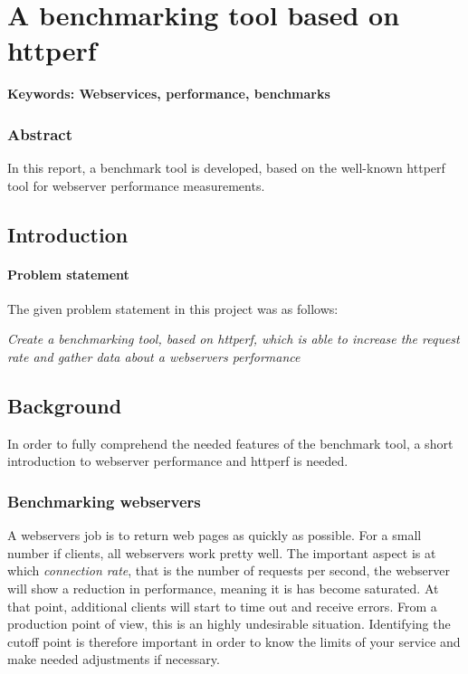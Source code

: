 \chapter{A benchmarking tool based on httperf}

\textbf{Keywords: Webservices, performance, benchmarks }

\subsection*{Abstract}

In this report, a benchmark tool is developed, based on the well-known httperf tool for webserver performance measurements. 

\section{Introduction}

\subsubsection{Problem statement}

The given problem statement in this project was as follows:

\emph{Create a benchmarking tool, based on httperf, which is able to increase the request rate and gather data about a webservers performance }

\section{Background}

In order to fully comprehend the needed features of the benchmark tool, a short introduction to webserver performance and httperf is needed. 

\subsection{Benchmarking webservers}

A webservers job is to return web pages as quickly as possible. For a small number if clients, all webservers work pretty well. The important aspect is at which \emph{connection rate}, that is the number of requests per second, the webserver will show a reduction in performance, meaning it is has become saturated. At that point, additional clients will start to time out and receive errors. From a production point of view, this is an highly undesirable situation. Identifying the cutoff point is therefore important in order to know the limits of your service and make needed adjustments if necessary.\\

